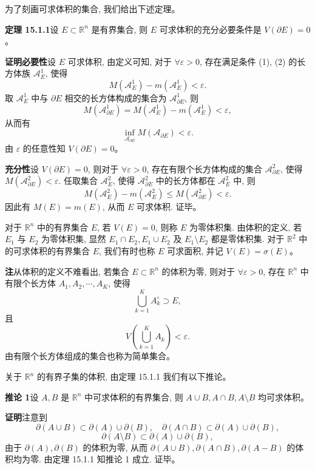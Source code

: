 \documentclass[UTF8, 12pt, fontset=fandol, oneside]{ctexart}
\begin{document}
为了刻画可求体积的集合, 我们给出下述定理。

\noindent\textbf{定理 15.1.1}\quad 设 $E\subset\mathbb R^n$ 是有界集合, 则 $E$ 可求体积的充分必要条件是 $V(\partial E)=0$。

\noindent\textbf{证明}\quad \textbf{必要性}\quad 设 $E$ 可求体积, 由定义可知, 对于 $\forall\varepsilon>0$, 存在满足条件 (1), (2) 的长方体族 $\mathcal A_E^1$, 使得
\[
  M(\mathcal A_E^1)-m(\mathcal A_E^1)<\varepsilon.
\]
取 $\mathcal A_E^1$ 中与 $\partial E$ 相交的长方体构成的集合为 $\mathcal A_{\partial E}^1$, 则
\[
  M(\mathcal A_{\partial E}^1)=M(\mathcal A_E^1)-m(\mathcal A_E^1)<\varepsilon,
\]
从而有
\[
  \inf_{\mathcal A_{\partial E}}M(\mathcal A_{\partial E})<\varepsilon.
\]
由 $\varepsilon$ 的任意性知 $V(\partial E)=0$。

\textbf{充分性}\quad 设 $V(\partial E)=0$, 则对于 $\forall\varepsilon>0$, 存在有限个长方体构成的集合 $\mathcal A_{\partial E}^2$, 使得 $M(\mathcal A_{\partial E}^2)<\varepsilon$. 任取集合 $\mathcal A_E^2$, 使得 $\mathcal A_{\partial E}^2$ 中的长方体都在 $\mathcal A_E^2$ 中, 则
\[
  M(\mathcal A_E^2)-m(\mathcal A_E^2)\leqslant M(\mathcal A_{\partial E}^2)<\varepsilon.
\]
因此有 $M(E)=m(E)$, 从而 $E$ 可求体积. 证毕。

对于 $\mathbb R^n$ 中的有界集合 $E$, 若 $V(E)=0$, 则称 $E$ 为零体积集. 由体积的定义, 若 $E_1$ 与 $E_2$ 为零体积集, 显然 $E_1\cap E_2,E_1\cup E_2$ 及 $E_1\setminus E_2$ 都是零体积集. 对于 $\mathbb R^2$ 中的可求体积的有界集合 $E$, 我们有时也称 $E$ 可求面积, 并记 $V(E)=\sigma(E)$。

\noindent\textbf{注}\quad 从体积的定义不难看出, 若集合 $E\subset\mathbb R^n$ 的体积为零, 则对于 $\forall\varepsilon>0$, 存在 $\mathbb R^n$ 中有限个长方体 $A_1,A_2,\cdots,A_K$, 使得
\[
  \bigcup_{k=1}^K A_k^\circ\supset E,
\]
且
\[
  V\left(\bigcup_{k=1}^K A_k\right)<\varepsilon.
\]
由有限个长方体组成的集合也称为简单集合。

关于 $\mathbb R^n$ 的有界子集的体积, 由定理 15.1.1 我们有以下推论。

\noindent\textbf{推论 1}\quad 设 $A,B$ 是 $\mathbb R^n$ 中可求体积的有界集合, 则 $A\cup B,A\cap B,A\setminus B$ 均可求体积。

\noindent\textbf{证明}\quad 注意到
\[
  \partial(A\cup B)\subset\partial(A)\cup\partial(B),\quad
  \partial(A\cap B)\subset\partial(A)\cup\partial(B),
\]
\[
  \partial(A\setminus B)\subset\partial(A)\cup\partial(B),
\]
由于 $\partial(A),\partial(B)$ 的体积为零, 从而 $\partial(A\cup B),\partial(A\cap B),\partial(A-B)$ 的体积均为零. 由定理 15.1.1 知推论 1 成立. 证毕。
\end{document}
